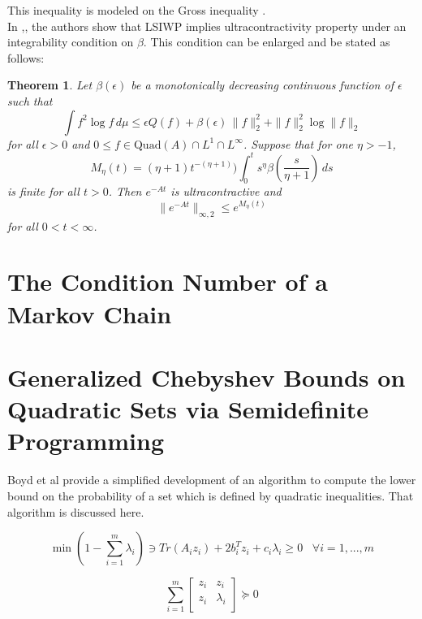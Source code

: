 \documentclass[a4paper]{article}
\theoremstyle{plain}
\newtheorem{thm}{Theorem}[section]
\theoremstyle{definition}
\theoremstyle{remark}
\numberwithin{equation}{section}
\begin{document}
This inequality is modeled on the Gross inequality \cite{}.
\\

In \cite{ds},\cite{d}, the authors show that LSIWP implies
ultracontractivity property  under an integrability condition on $\beta$. This condition can be enlarged and be stated as follows:

\begin{thm}
Let ${\beta}(\epsilon)$ be a monotonically decreasing continuous
function of $\epsilon$
such that
\begin{equation*}\label{vareps}
\int f^2\log f \, d{\mu}\leq
\epsilon Q(f) +{\beta}(\epsilon)\, \|f\|^2_2 + \|f\|^2_2\log \|f\|_2
\end{equation*}
for all $\epsilon >0$ and $0\leq f\in \mbox{Quad}(A)\cap L^1\cap
L^{\infty}$. Suppose that
for one ${\eta}>-1$,
\begin{equation*}\label{integral}
M_{\eta}(t)=({\eta}+1)t^{-({\eta}+1)})\int_0^t
{s}^{\eta}{\beta}\left(\frac{s}{\eta+1}\right)
\,ds
 \end{equation*}
is finite for  all $t>0$. Then $e^{-At}$ is ultracontractive
and
\begin{equation*}\label{majo}
\| e^{-At} \|_{\infty,2}\leq e^{M_{\eta}(t)}
\end{equation*}
for all $0<t<\infty$.
\end{thm}


\section{The Condition Number of a Markov Chain}

\section{Generalized Chebyshev Bounds on Quadratic Sets via Semidefinite Programming}
Boyd et al  \cite{SDPVandenberghe_generalizedchebyshev} provide a simplified development of an algorithm to compute the lower bound on the probability of a set which is defined by quadratic inequalities. That algorithm is discussed here.

\begin{equation*}
\min (1-  \sum\limits_{i=1}^{m} \lambda_i)  \ni Tr( A_i z_i) + 2 b_{i}^{T} z_i + c_i \lambda_i \geqslant 0 \;\;\; \forall i=1, ... , m
\end{equation*}

\begin{equation*}  \sum\limits_{i=1}^{m}  [
\begin{array}{cc}
z_i & z_i \\
z_i & \lambda_i \\
\end{array} ] \succeq 0 \end{equation*}
\end{document}
